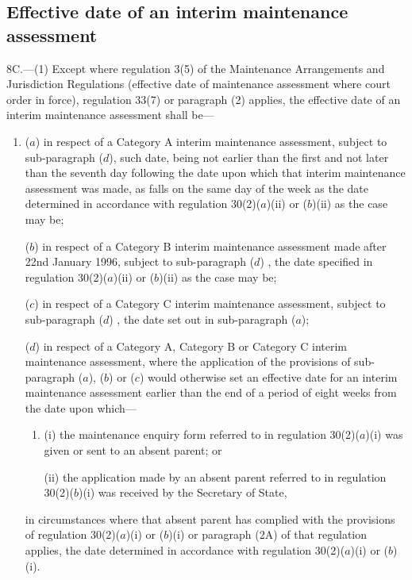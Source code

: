 \documentclass[a4paper,12pt]{article}
\begin{document}
\subsection[8C. Effective date of an interim maintenance assessment]{Effective date of an interim maintenance assessment}

8C.—(1) Except where regulation 3(5) of the Maintenance Arrangements and Jurisdiction Regulations (effective date of maintenance assessment where court order in force), regulation 
33(7) or paragraph (2) applies, the effective date of an interim maintenance assessment shall be—
\begin{enumerate}\item[]
($a$) in respect of a Category A interim maintenance assessment, subject to 
sub-paragraph ($d$), such date, being not earlier than the first and not later than the seventh day following the date upon which that interim maintenance assessment was made, as falls on the same day of the week as the date determined in accordance with regulation 30(2)($a$)(ii) or ($b$)(ii) as the case may be;

($b$) in respect of a Category B interim maintenance assessment made after 22nd January 1996, subject to sub-paragraph ($d$)%
, the date specified in regulation 30(2)($a$)(ii) or ($b$)(ii) as the case may be;

($c$) in respect of a Category C interim maintenance assessment, subject to sub-paragraph ($d$)%
, the date set out in sub-paragraph ($a$);

($d$) in respect of a Category A, Category B or Category C interim maintenance assessment, where the application of the provisions of sub-\hspace{0pt}paragraph ($a$), ($b$) or ($c$) would otherwise set an effective date for an interim maintenance assessment earlier than the end of a period of eight weeks from the date upon which—
\begin{enumerate}\item[]
\begin{sloppypar}
(i) the maintenance enquiry form referred to in regulation 30(2)($a$)(i) was given or sent to an absent parent; or
\end{sloppypar}

(ii) the application made by an absent parent referred to in regulation 30(2)($b$)(i) was received by the Secretary of State,
\end{enumerate}
in circumstances where that absent parent has complied with the provisions of regulation 30(2)($a$)(i) or ($b$)(i) or paragraph (2A) of that regulation applies, the date determined in accordance with regulation 30(2)($a$)(i) or ($b$)(i).
\end{enumerate}
\end{document}
